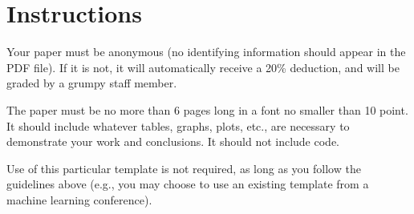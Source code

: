 \section{Instructions}%

Your paper must be anonymous (no identifying information should appear in the PDF file).  If it is not, it will automatically receive a 20\% deduction, and will be graded by a grumpy staff member.

The paper must be no more than 6 pages long in a font no smaller than 10 point. It should include whatever tables, graphs, plots, etc., are necessary to demonstrate your work and conclusions. It should not include code.

Use of this particular template is not required, as long as you follow the guidelines above (e.g., you may choose to use an existing template from a machine learning conference).